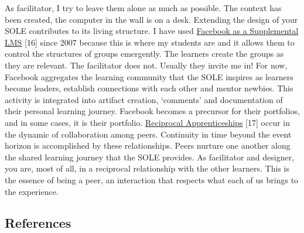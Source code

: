 As facilitator, I try to leave them alone as much
as possible. The context has been created, the computer in the wall is
on a desk. Extending the design of your SOLE contributes to its living
structure. I have used
\href{http://community.telecentre.org/profiles/blogs/facebook-as-a-supplemental-lms}{Facebook
as a Supplemental LMS} {[}16{]} since 2007 because this is where my
students are and it allows them to control the structures of groups
emergently. The learners create the groups as they are relevant. The
facilitator does not. Usually they invite me in! For now, Facebook
aggregates the learning community that the SOLE inspires as learners
become leaders, establish connections with each other and mentor
newbies. This activity is integrated into artifact creation, `comments'
and documentation of their personal learning journey. Facebook becomes a
precursor for their portfolios, and in some cases, it is their
portfolio.
\href{http://starwars.wikia.com/wiki/Reciprocal\_apprenticeship}{Reciprocal
Apprenticeships} {[}17{]} occur in the dynamic of collaboration among
peers. Continuity in time beyond the event horizon is accomplished by
these relationships. Peers nurture one another along the shared learning
journey that the SOLE provides. As facilitator and designer, you are,
most of all, in a reciprocal relationship with the other learners. This
is the essence of being a peer, an interaction that respects what each
of us brings to the experience.

\subsection{References}

